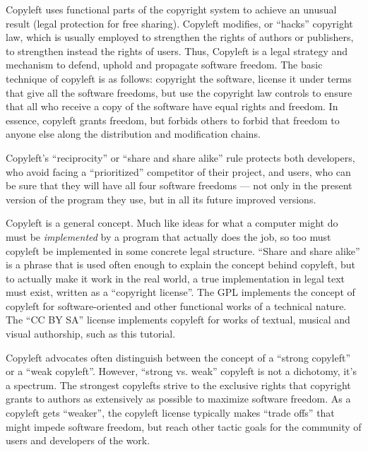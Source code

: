 Copyleft uses functional parts of the copyright system to achieve an unusual
result (legal protection for free sharing). Copyleft modifies, or ``hacks''
copyright law, which is usually employed to strengthen the rights of authors
or publishers, to strengthen instead the rights of users.  Thus, Copyleft is
a legal strategy and mechanism to defend, uphold and propagate software
freedom. The basic technique of copyleft is as follows: copyright the
software, license it under terms that give all the software freedoms, but use
the copyright law controls to ensure that all who receive a copy of the
software have equal rights and freedom. In essence, copyleft grants freedom,
but forbids others to forbid that freedom to anyone else along the
distribution and modification chains.

Copyleft's ``reciprocity'' or ``share and share alike'' rule protects both
developers, who avoid facing a ``prioritized'' competitor of their project,
and users, who can be sure that they will have all four software freedoms ---
not only in the present version of the program they use, but in all its
future improved versions.

Copyleft is a general concept. Much like ideas for what a computer might
do must be \emph{implemented} by a program that actually does the job, so
too must copyleft be implemented in some concrete legal structure.
``Share and share alike'' is a phrase that is used often enough to explain the
concept behind copyleft, but to actually make it work in the real world, a
true implementation in legal text must exist, written as a ``copyright
license''.  The GPL implements the concept of copyleft for software-oriented
and other functional works of a technical nature.  The ``CC BY SA'' license
implements copyleft for works of textual, musical and visual authorship, such
as this tutorial.

Copyleft advocates often distinguish between the concept of a ``strong
copyleft'' or a ``weak copyleft''.  However, ``strong vs. weak'' copyleft is
not a dichotomy, it's a spectrum.  The strongest copylefts strive to the
exclusive rights that copyright  grants to authors as extensively as possible
to maximize software freedom.  As a copyleft gets ``weaker'', the copyleft
license typically makes ``trade offs'' that might impede software freedom,
but reach other tactic goals for the community of users and developers of the
work.

